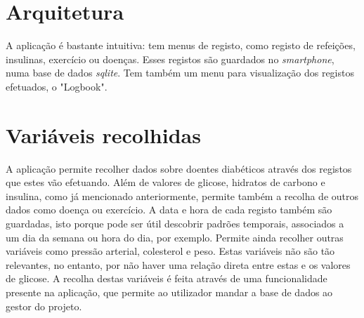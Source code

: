 \section{Arquitetura}


A aplicação é bastante intuitiva: tem menus de registo, como registo de refeições, insulinas, exercício ou doenças. Esses registos são guardados no \textit{smartphone}, numa base de dados \textit{sqlite}. Tem também um menu para visualização dos registos efetuados, o "Logbook". 

\section{Variáveis recolhidas}

A aplicação permite recolher dados sobre doentes diabéticos através dos registos que estes vão efetuando. Além de valores de glicose, hidratos de carbono e insulina, como já mencionado anteriormente, permite também a recolha de outros dados como doença ou exercício. A data e hora de cada registo também são guardadas, isto porque pode ser útil descobrir padrões temporais, associados a um dia da semana ou hora do dia, por exemplo. Permite ainda recolher outras variáveis como pressão arterial, colesterol e peso. Estas variáveis não são tão relevantes, no entanto, por não haver uma relação direta entre estas e os valores de glicose. A recolha destas variáveis é feita através de uma funcionalidade presente na aplicação, que permite ao utilizador mandar a base de dados ao gestor do projeto. 





